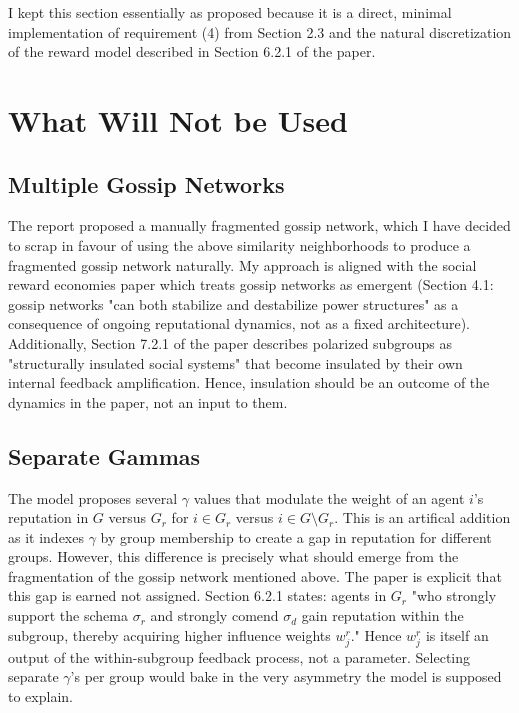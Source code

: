 \documentclass[12pt]{article}
\begin{document}
I kept this section essentially as proposed because it is a direct, minimal implementation of requirement (4)
from Section 2.3 and the natural discretization of the reward model described in Section 6.2.1 of the paper.

\section{What Will Not be Used}

\subsection{Multiple Gossip Networks}
The report proposed a manually fragmented gossip network, which I have decided to scrap
in favour of using the above similarity neighborhoods to produce a fragmented gossip network
naturally. My approach is aligned with the social reward economies paper which treats
gossip networks as emergent (Section 4.1: gossip networks "can both stabilize and destabilize power structures"
as a consequence of ongoing reputational dynamics, not as a fixed architecture). Additionally, Section 7.2.1
of the paper describes polarized subgroups as "structurally insulated social systems" that become insulated
by their own internal feedback amplification. Hence, insulation should be an outcome of the dynamics in the paper,
not an input to them.

\subsection{Separate Gammas}
The model proposes several $\gamma$ values that modulate the weight of an agent $i$'s reputation in $G$ versus $G_r$
for $i \in G_r$ versus $i \in G \setminus G_r$. This is an artifical addition
as it indexes $\gamma$ by group membership to create a gap in reputation for different groups.
However, this difference is precisely what should emerge from the fragmentation of the gossip network mentioned above.
The paper is explicit that this gap is earned not assigned. Section 6.2.1 states: agents in $G_r$ "who strongly support the schema $\sigma_r$
and strongly comend $\sigma_d$ gain reputation within the subgroup, thereby acquiring higher influence weights $w_j^r$."
Hence $w_j^r$ is itself an output of the within-subgroup feedback process, not a parameter.
Selecting separate $\gamma$'s per group would bake in the very asymmetry the model is supposed to explain.
\end{document}
